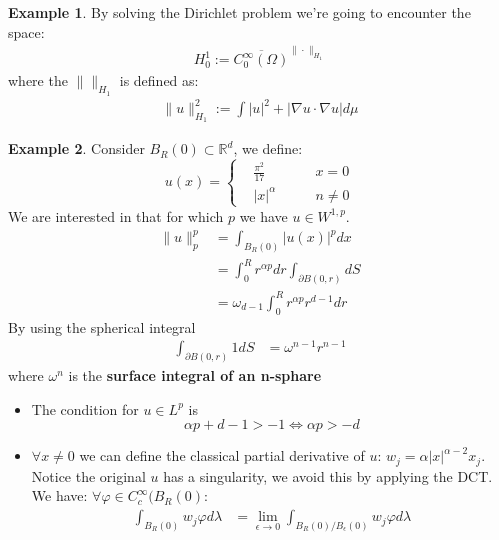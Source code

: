 \documentclass[a4paper,11pt,oneside,fleqn]{book}
\theoremstyle{definition}
\newtheorem*{example}{Example}
\theoremstyle{remark}
\begin{document}
\begin{example}
By solving the Dirichlet problem we're going to encounter the space:
\begin{align*}
	H^1_0:= \overline{ C_0^\infty(\Omega)}^{\|\cdot\|_{H_1}}
\end{align*}
where the $\|\|_{H_1}$ is defined as:
\begin{align*}
	\|u\|_{H_1}^2 := \int |u|^2 + |\nabla u \cdot \nabla u|  d\mu
\end{align*}
\end{example}

\begin{example}
Consider $B_R(0) \subset \mathbb{R}^d$, we define:
\begin{equation*}
u(x) = \left\{ 
	\begin{aligned}
		&\frac{\pi^2}{17} \quad &x = 0\\
		&|x|^\alpha \quad \quad &n \neq 0
	\end{aligned}
	\right.
\end{equation*}	
We are interested in that for which $p$ we have $u \in W^{1, p}$. 
\begin{align*}
	\|u\|_p^p &= \int_{B_R(0)} |u(x)|^p dx \\
	&= \int_0^R r^{\alpha p} dr \int_{\partial B(0, r)} dS  \\
	&= \omega_{d-1} \int_0^R r^{\alpha p} r^{d-1}dr
\end{align*}
By using the spherical integral
\begin{equation}
\begin{aligned}
	\int_{\partial B(0, r)} 1 dS &= \omega^{n-1} r^{n-1}
\end{aligned}
\end{equation}
where $\omega^n$ is the \textbf{surface integral of an n-sphare}
\begin{itemize}
	\item The condition for $u \in L^p$ is 
\begin{equation*}
	\alpha p + d-1 > -1 \Leftrightarrow \alpha p > -d
\end{equation*}
	\item $\forall x \neq 0$ we can define the classical partial derivative of $u$: $w_j = \alpha |x|^{\alpha - 2} x_j$. Notice the original $u$ has a singularity, we avoid this by applying the DCT. We have: $\forall \varphi \in C_c^\infty(B_R(0)$:
	\begin{align*}
		\int_{B_R(0)} w_j \varphi d\lambda &= \lim_{\epsilon \rightarrow 0} \int_{B_R(0)\slash B_\epsilon (0)} w_j \varphi d\lambda \\

\end{align*}
\end{itemize}
\end{example}
\end{document}
